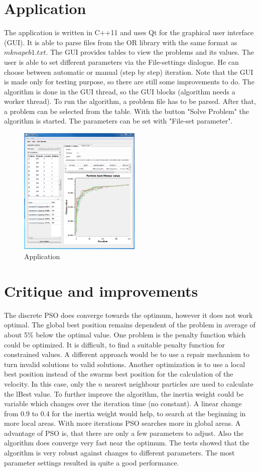 \documentclass{article}
\begin{document}
\section{Application}
\label{lbl-app}
The application is written in C++11 and uses Qt for the graphical user interface (GUI). It is able to parse files from the OR library with the same format as $mknapcb1.txt$. The GUI   provides tables to view the problems and its values. The user is able to set different parameters via the File-settings dialogue. He can choose between automatic or manual (step by step) iteration. Note that the GUI is made only for testing purpose, so there are still some improvements to do. The algorithm is done in the GUI thread, so the GUI blocks (algorithm needs a worker thread). To run the algorithm, a problem file has to be parsed. After that, a problem can be selected from the table. With the button "Solve Problem" the algorithm is started. The parameters can be set with "File-set parameter".

\begin{figure}[H]
    \centering
    \includegraphics[width=220px]{images/image_main.PNG}
    \caption{Application}
    \label{fig-app}
\end{figure}

\section{Critique and improvements}
\label{lbl-impr}
The discrete PSO does converge towards the optimum, however it does not work optimal. The global best position remains dependent of the problem in average of about 5\% below the optimal value. One problem is the penalty function which could be optimized. It is difficult, to find a suitable penalty function for constrained values. A different approach would be to use a repair mechanism to turn invalid solutions to valid solutions. Another optimization is to use a local best position instead of the swarms best position for the calculation of the velocity. In this case, only the $n$ nearest neighbour particles are used to calculate the lBest value. To further improve the algorithm, the inertia weight could be variable which changes over the iteration time (no constant). A linear change from 0.9 to 0.4 for the inertia weight would help, to search at the beginning in more local areas. With more iterations PSO searches more in global areas. A advantage of PSO is, that there are only a few parameters to adjust. Also the algorithm does converge very fast near the optimum. The tests showed that the algorithm is very robust against changes to different parameters. The most parameter settings resulted in quite a good performance.
\end{document}

